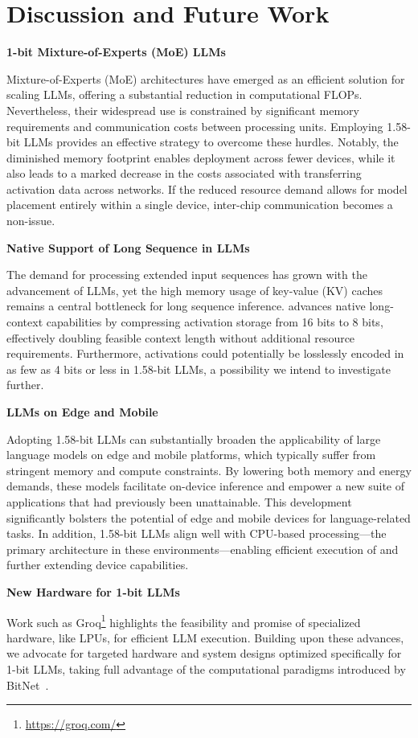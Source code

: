 \section{Discussion and Future Work}

\textbf{1-bit Mixture-of-Experts (MoE) LLMs}

Mixture-of-Experts (MoE) architectures have emerged as an efficient solution for scaling LLMs, offering a substantial reduction in computational FLOPs. Nevertheless, their widespread use is constrained by significant memory requirements and communication costs between processing units. Employing 1.58-bit LLMs provides an effective strategy to overcome these hurdles. Notably, the diminished memory footprint enables deployment across fewer devices, while it also leads to a marked decrease in the costs associated with transferring activation data across networks. If the reduced resource demand allows for model placement entirely within a single device, inter-chip communication becomes a non-issue.

\textbf{Native Support of Long Sequence in LLMs}

The demand for processing extended input sequences has grown with the advancement of LLMs, yet the high memory usage of key-value (KV) caches remains a central bottleneck for long sequence inference.  advances native long-context capabilities by compressing activation storage from 16 bits to 8 bits, effectively doubling feasible context length without additional resource requirements. Furthermore, activations could potentially be losslessly encoded in as few as 4 bits or less in 1.58-bit LLMs, a possibility we intend to investigate further.

\textbf{LLMs on Edge and Mobile}

Adopting 1.58-bit LLMs can substantially broaden the applicability of large language models on edge and mobile platforms, which typically suffer from stringent memory and compute constraints. By lowering both memory and energy demands, these models facilitate on-device inference and empower a new suite of applications that had previously been unattainable. This development significantly bolsters the potential of edge and mobile devices for language-related tasks. In addition, 1.58-bit LLMs align well with CPU-based processing—the primary architecture in these environments—enabling efficient execution of  and further extending device capabilities.

\textbf{New Hardware for 1-bit LLMs}

Work such as Groq\footnote{\url{https://groq.com/}} highlights the feasibility and promise of specialized hardware, like LPUs, for efficient LLM execution. Building upon these advances, we advocate for targeted hardware and system designs optimized specifically for 1-bit LLMs, taking full advantage of the computational paradigms introduced by BitNet~\cite{bitnet}.